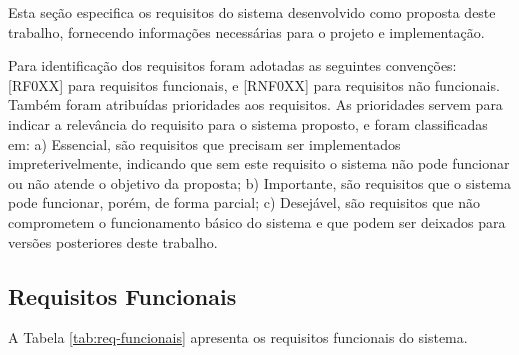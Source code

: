 Esta seção especifica os requisitos do sistema desenvolvido como proposta deste trabalho, fornecendo informações necessárias para o projeto e implementação.

Para identificação dos requisitos foram adotadas as seguintes convenções: [RF0XX] para requisitos funcionais, e [RNF0XX] para requisitos não funcionais. Também foram atribuídas prioridades aos requisitos. As prioridades servem para indicar a relevância do requisito para o sistema proposto, e foram classificadas em: a) Essencial, são requisitos que precisam ser implementados impreterivelmente, indicando que sem este requisito o sistema não pode funcionar ou não atende o objetivo da proposta; b) Importante, são requisitos que o sistema pode funcionar, porém, de forma parcial; c) Desejável, são requisitos que não comprometem o funcionamento básico do sistema e que podem ser deixados para versões posteriores deste trabalho.

\subsection{Requisitos Funcionais}

A Tabela \ref{tab:req-funcionais} apresenta os requisitos funcionais do sistema.

